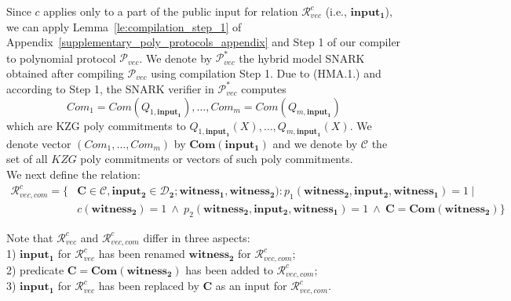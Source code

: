 Since $c$ applies only to a part of the public input for relation $\mathcal{R}_{\mathit{vec}}^c$ 
(i.e., $\mathbf{input_1}$), we can apply Lemma~\ref{le:compilation_step_1} of Appendix~\ref{supplementary_poly_protocols_appendix} and Step 1 
of our compiler to polynomial protocol $\mathscr{P}_{\mathit{vec}}$. We denote by $\mathscr{P}^*_{\mathit{vec}}$ the hybrid model SNARK obtained 
after compiling $\mathscr{P}_{\mathit{vec}}$ using compilation Step 1. Due to (HMA.1.) and according to Step 1, the SNARK verifier in 
$\mathscr{P}^*_{\mathit{vec}}$ computes $$\mathit{Com_1} = \mathit{Com}(\mathit{Q_{1,\mathbf{input_1}}}), \ldots, \mathit{Com_m} = \mathit{Com}(\mathit{Q_{m,\mathbf{input_1}}})$$ 
which are KZG poly commitments to $\mathit{Q_{1,\mathbf{input_1}}}(X), \ldots, \mathit{Q_{m, \mathbf{input_1}}}(X)$. We denote vector
$(\mathit{Com_1}, \ldots, \mathit{Com_m})$ by $\mathbf{Com}(\mathbf{input_1})$ and we denote 
by $\mathcal{C}$ the set of all $\mathit{KZG}$ poly commitments or vectors of such poly commitments.\\

We next define the relation: 
\begin{align*}
\mathcal{R}_{\mathit{vec}, \mathit{com}}^c = \{& \mathbf{C} \in \mathcal{C}, \mathbf{input_2} \in \mathbf{\mathcal{D}_2}; \mathbf{witness_1}, \mathbf{witness_2}): p_1(\mathbf{witness_2}, \mathbf{input_2}, \mathbf{witness_1}) =1  \ | \\
& c(\mathbf{witness_2}) = 1  \ \wedge \ p_2(\mathbf{witness_2}, \mathbf{input_2}, \mathbf{witness_1}) = 1\ \wedge \ \mathbf{C} = \mathbf{Com}(\mathbf{witness_2})\}
\end{align*}

\noindent Note that $\mathcal{R}_{\mathit{vec}}^c$ and $\mathcal{R}_{\mathit{vec}, \mathit{com}}^c$ differ in three aspects: \\
1) $\mathbf{input_1}$ for $\mathcal{R}_{\mathit{vec}}^c$ has been renamed $\mathbf{witness_2}$ for $\mathcal{R}_{\mathit{vec}, \mathit{com}}^c$;  \\
2) predicate $\mathbf{C} = \mathbf{Com}(\mathbf{witness_2})$ has been added to $\mathcal{R}_{\mathit{vec}, \mathit{com}}^c$;  \\
3) $\mathbf{input_1}$ for $\mathcal{R}_{\mathit{vec}}^c$ has been replaced by $\mathbf{C}$ as an input for $\mathcal{R}_{\mathit{vec}, \mathit{com}}^c$.  \\

